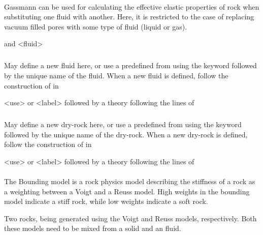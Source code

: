 {\paragraph{}
 \slist
   \item \Description Gassmann can be used for calculating the effective elastic properties of rock when substituting one fluid with another. Here, it is restricted to the case of replacing vacuum filled pores with some type of fluid (liquid or gas). 
   \item {} and <fluid>
   \item \Default 
 \elist

\subparagraph{}
 \slist
   \item \Description May define a new fluid here, or use a predefined  from  using the keyword  followed by the unique name of the fluid. When a new fluid is defined, follow the construction of  in 
   \item \Argument <use> or <label> followed by a theory following the lines of 
   \item \Default
 \elist

\subparagraph{}
 \slist
   \item \Description  May define a new dry-rock here, or use a predefined  from  using the keyword  followed by the unique name of the dry-rock. When a new dry-rock is defined, follow the construction of  in 
   \item \Argument <use> or <label> followed by a theory following the lines of 
   \item \Default
 \elist

\paragraph{}
 \slist
   \item \Description The Bounding model is a rock physics model describing the stiffness of a rock as a weighting between a Voigt and a Reuss model. High weights in the bounding model indicate a stiff rock, while low weights indicate a soft rock.
   \item \Argument Two rocks, being generated using the Voigt and Reuss models, respectively. Both these models need to be mixed from a solid and an fluid. 
   \item \Default 
 \elist

}
